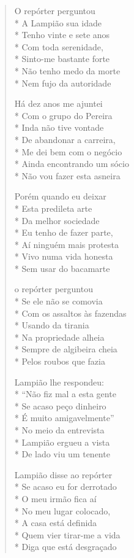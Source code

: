 \begin{verse}
O repórter perguntou\\*
A Lampião sua idade\\*
Tenho vinte e sete anos\\*
Com toda serenidade,\\*
Sinto-me bastante forte\\*
Não tenho medo da morte\\*
Nem fujo da autoridade

Há dez anos me ajuntei\\*
Com o grupo do Pereira\\*
Inda não tive vontade\\*
De abandonar a carreira,\\*
Me dei bem com o negócio\\*
Ainda encontrando um sócio\\*
Não vou fazer esta asneira

Porém quando eu deixar\\*
Esta predileta arte\\*
Da melhor sociedade\\*
Eu tenho de fazer parte,\\*
Aí ninguém mais protesta\\*
Vivo numa vida honesta\\*
Sem usar do bacamarte

o repórter perguntou\\*
Se ele não se comovia\\*
Com os assaltos às fazendas\\*
Usando da tirania\\*
Na propriedade alheia\\*
Sempre de algibeira cheia\\*
Pelos roubos que fazia

Lampião lhe respondeu:\\*
``Não fiz mal a esta gente\\*
Se acaso peço dinheiro\\*
É muito amigavelmente''\\*
No meio da entrevista\\*
Lampião ergueu a vista\\*
De lado viu um tenente

Lampião disse ao repórter\\*
Se acaso eu for derrotado\\*
O meu irmão fica aí\\*
No meu lugar colocado,\\*
A casa está definida\\*
Quem vier tirar-me a vida\\*
Diga que está desgraçado


\end{verse}
